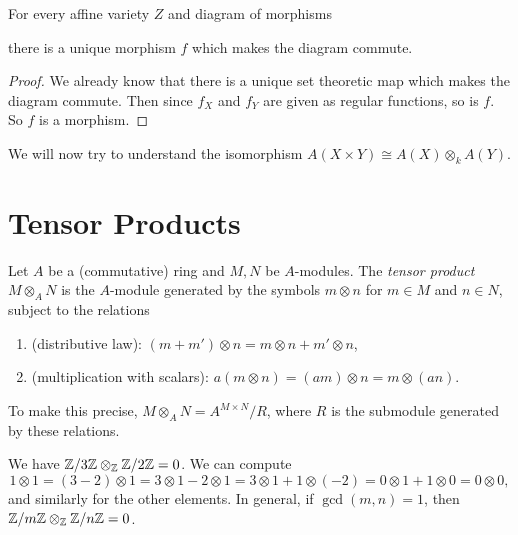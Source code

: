 \begin{prop}
  For every affine variety $Z$ and
  diagram of morphisms
  \begin{center}
  \end{center}
  there is a unique morphism $f$ which
  makes the diagram commute.
\end{prop}

\begin{proof}
  We already know that there is a unique
  set theoretic map which makes the
  diagram commute. Then since
  $f_X$ and $f_Y$ are given as regular
  functions, so is $f$. So $f$ is a
  morphism.
\end{proof}

\begin{remark}
  We will now try to understand the
  isomorphism
  $A(X \times Y) \cong A(X) \otimes_k A(Y)$.
\end{remark}

\section{Tensor Products}

\begin{definition}
  Let $A$ be a (commutative) ring and $M, N$
  be $A$-modules. The \emph{tensor product}
  $M \otimes_A N$ is the $A$-module
  generated by the symbols $m \otimes n$
  for $m \in M$ and $n \in N$, subject to
  the relations
  \begin{enumerate}
    \item (distributive law):
      $(m + m') \otimes n = m \otimes n + m' \otimes n$,
    \item (multiplication with scalars):
      $a(m \otimes n) = (am) \otimes n = m \otimes (an)$.
  \end{enumerate}
  To make this precise,
  $M \otimes_A N = A^{M \times N} / R$, where
  $R$ is the submodule generated by
  these relations.
\end{definition}

\begin{example}
  We have $\mathbb{Z} / 3\mathbb{Z} \otimes_{\mathbb{Z}} \mathbb{Z} / 2\mathbb{Z} = 0$. We can compute
  \[
    1 \otimes 1
    = (3 - 2) \otimes 1
    = 3 \otimes 1 - 2 \otimes 1
    = 3 \otimes 1 + 1 \otimes (-2)
    = 0 \otimes 1 + 1 \otimes 0
    = 0  \otimes 0,
  \]
  and similarly for the other elements. In
  general, if $\gcd(m, n) = 1$, then
  $\mathbb{Z} / m\mathbb{Z} \otimes_{\mathbb{Z}} \mathbb{Z} / n\mathbb{Z} = 0$.
\end{example}

